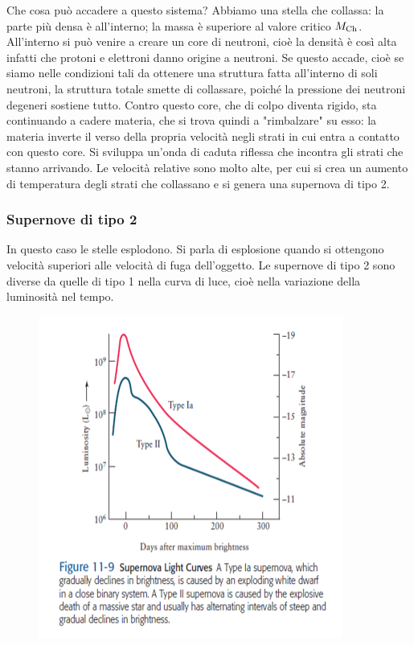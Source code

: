 Che cosa può accadere a questo sistema? Abbiamo una stella che collassa: la parte più densa è all'interno; la massa è superiore al valore critico $M_{\rm Ch}$. All'interno si può venire a creare un core di neutroni, cioè la densità è così alta infatti che protoni e elettroni danno origine a neutroni. Se questo accade, cioè se siamo nelle condizioni tali da ottenere una struttura fatta all'interno di soli neutroni, la struttura totale smette di collassare, poiché la pressione dei neutroni degeneri sostiene tutto. Contro questo core, che di colpo diventa rigido, sta continuando a cadere materia, che si trova quindi a "rimbalzare" su esso: la materia inverte il verso della propria velocità negli strati in cui entra a contatto con questo core. Si sviluppa un'onda di caduta riflessa che incontra gli strati che stanno arrivando. Le velocità relative sono molto alte, per cui si crea un aumento di temperatura degli strati che collassano e si genera una supernova di tipo 2.

\subsubsection{Supernove di tipo 2}
In questo caso le stelle esplodono. Si parla di esplosione quando si ottengono velocità superiori alle velocità di fuga dell'oggetto. Le supernove di tipo 2 sono diverse da quelle di tipo 1 nella curva di luce, cioè nella variazione della luminosità nel tempo.

\begin{figure}[H]
    \centering
    \includegraphics[width=10cm]{lezione 28 novembre/supernovatipouno.png}
    \label{lezione 28 novembre/supernovatipouno.png}
\end{figure}

